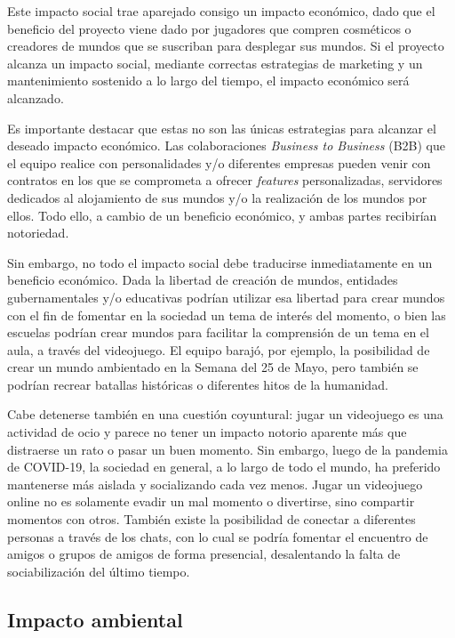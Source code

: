 Este impacto social trae aparejado consigo un impacto económico, dado que el beneficio del proyecto viene dado por jugadores 
que compren cosméticos o creadores de mundos que se suscriban para desplegar sus mundos. Si el proyecto alcanza un impacto 
social, mediante correctas estrategias de marketing y un mantenimiento sostenido a lo largo del tiempo, el impacto económico 
será alcanzado.
\vspace{0.25cm}

Es importante destacar que estas no son las únicas estrategias para alcanzar el deseado impacto económico. Las colaboraciones 
\textit{Business to Business} (B2B) que el equipo realice con personalidades y/o diferentes empresas pueden venir 
con contratos en los que se comprometa a ofrecer \textit{features} personalizadas, servidores dedicados al alojamiento de 
sus mundos y/o la realización de los mundos por ellos. Todo ello, a cambio de un beneficio económico, y ambas partes recibirían 
notoriedad.
\vspace{0.25cm}

Sin embargo, no todo el impacto social debe traducirse inmediatamente en un beneficio económico. Dada la libertad de 
creación de mundos, entidades gubernamentales y/o educativas podrían utilizar esa libertad para crear mundos con el fin 
de fomentar en la sociedad un tema de interés del momento, o bien las escuelas podrían crear mundos para facilitar la 
comprensión de un tema en el aula, a través del videojuego. El equipo barajó, por ejemplo, la posibilidad de crear un 
mundo ambientado en la Semana del 25 de Mayo, pero también se podrían recrear batallas históricas o diferentes hitos de 
la humanidad.
\vspace{0.25cm}

Cabe detenerse también en una cuestión coyuntural: jugar un videojuego es una actividad de ocio y parece no tener un impacto 
notorio aparente más que distraerse un rato o pasar un buen momento. Sin embargo, luego de la pandemia de COVID-19, 
la sociedad en general, a lo largo de todo el mundo, ha preferido mantenerse más aislada y socializando cada vez menos. 
Jugar un videojuego online no es solamente evadir un mal momento o divertirse, sino compartir momentos con otros. También 
existe la posibilidad de conectar a diferentes personas a través de los chats, con lo cual se podría fomentar el encuentro 
de amigos o grupos de amigos de forma presencial, desalentando la falta de sociabilización del último tiempo.

\subsection{Impacto ambiental}

